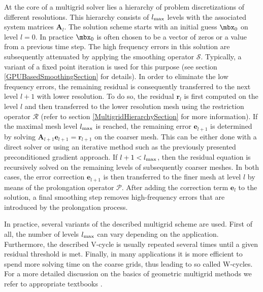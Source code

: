 At the core of a multigrid solver lies a hierarchy of problem discretizations of different resolutions. This hierarchy consists of $l_{\textnormal{max}}$ levels with the associated system matrices $\mathbf A _l$. The solution scheme starts with an initial guess $\mbx _0$ on level $l=0$. In practice $\mbx _0$ is often chosen to be a vector of zeros or a value from a previous time step. The high frequency errors in this solution are subsequently attenuated by applying the smoothing operator $\mathcal{S}$. Typically, a variant of a fixed point iteration is used for this purpose (see section \ref{GPUBasedSmoothingSection} for details). In order to eliminate the low frequency errors, the remaining residual is consequently transferred to the next level $l+1$ with lower resolution. To do so, the residual $\mathbf r_l$ is first computed on the level $l$ and then transferred to the lower resolution mesh using the restriction operator $\mathcal{R}$ (refer to section \ref{MultigridHierarchySection} for more information). If the maximal mesh level $l_{\textnormal{max}}$ is reached, the remaining error $\mathbf e_{l+1}$ is determined by solving $\mathbf A _{l+1} \mathbf e_{l+1} = \mathbf r_{l+1}$ on the coarser mesh. This can be either done with a direct solver or using an iterative method such as the previously presented preconditioned gradient approach. If $l+1 < l_{\textnormal{max}}$, then the residual equation is recursively solved on the remaining levels of subsequently coarser meshes. In both cases, the error correction $\mathbf e_{l+1}$ is then transferred to the finer mesh at level $l$ by means of the prolongation operator $\mathcal{P}$. After adding the correction term $\mathbf e_{l}$ to the solution, a final smoothing step removes high-frequency errors that are introduced by the prolongation process.

In practice, several variants of the described multigrid scheme are used. First of all, the number of levels $l_{\textnormal{max}}$ can vary depending on the application. Furthermore, the described V-cycle is usually repeated several times until a given residual threshold is met. Finally, in many applications it is more efficient to spend more solving time on the coarse grids, thus leading to so called W-cycles. For a more detailed discussion on the basics of geometric multigrid methods we refer to appropriate textbooks \cite{Braess2007}.  

